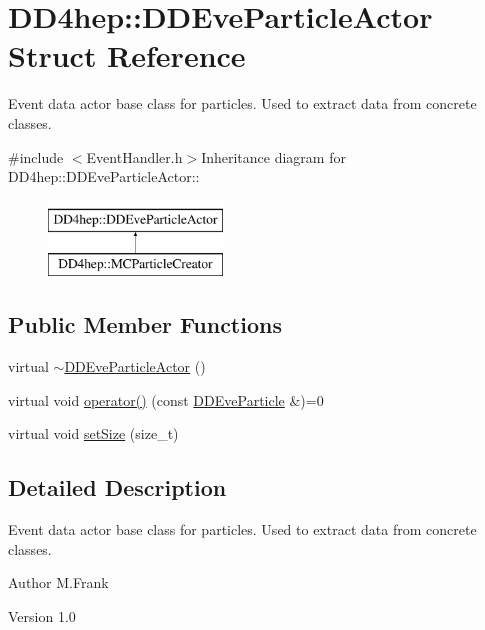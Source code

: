 \hypertarget{struct_d_d4hep_1_1_d_d_eve_particle_actor}{
\section{DD4hep::DDEveParticleActor Struct Reference}
\label{struct_d_d4hep_1_1_d_d_eve_particle_actor}
}


Event data actor base class for particles. Used to extract data from concrete classes.  


{\ttfamily \#include $<$EventHandler.h$>$}Inheritance diagram for DD4hep::DDEveParticleActor::\begin{figure}[H]
\begin{center}
\leavevmode
\includegraphics[height=2cm]{struct_d_d4hep_1_1_d_d_eve_particle_actor}
\end{center}
\end{figure}
\subsection*{Public Member Functions}
\begin{DoxyCompactItemize}
\item 
virtual \hyperlink{struct_d_d4hep_1_1_d_d_eve_particle_actor_a98cc089b4106ef7c3e468ced02532917}{$\sim$DDEveParticleActor} ()
\item 
virtual void \hyperlink{struct_d_d4hep_1_1_d_d_eve_particle_actor_a27707fecbdb50e7566ec01c784fcc669}{operator()} (const \hyperlink{class_d_d4hep_1_1_d_d_eve_particle}{DDEveParticle} \&)=0
\item 
virtual void \hyperlink{struct_d_d4hep_1_1_d_d_eve_particle_actor_ac272c9587190181a943894d5983b1ac9}{setSize} (size\_\-t)
\end{DoxyCompactItemize}


\subsection{Detailed Description}
Event data actor base class for particles. Used to extract data from concrete classes. \begin{DoxyAuthor}{Author}
M.Frank 
\end{DoxyAuthor}
\begin{DoxyVersion}{Version}
1.0 
\end{DoxyVersion}



